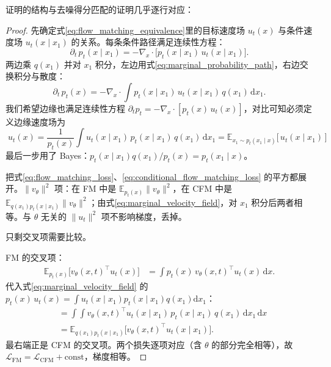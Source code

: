 证明的结构与去噪得分匹配的证明几乎逐行对应：
\begin{proof}
先确定式\eqref{eq:flow_matching_equivalence}里的目标速度场 $u_t(x)$ 与条件速度场 $u_t(x\mid x_1)$ 的关系。每条条件路径满足连续性方程：
\begin{equation}
\partial_t\, p_t(x\mid x_1) = -\nabla_x\cdot\big[p_t(x\mid x_1)\,u_t(x\mid x_1)\big].
\end{equation}
两边乘 $q(x_1)$ 并对 $x_1$ 积分，左边用式\eqref{eq:marginal_probability_path}，右边交换积分与散度：
\begin{equation}
\partial_t\, p_t(x)
= -\nabla_x\cdot\!\int p_t(x\mid x_1)\,u_t(x\mid x_1)\,q(x_1)\,\mathrm{d}x_1.
\end{equation}
我们希望边缘也满足连续性方程 $\partial_t p_t = -\nabla_x\cdot[p_t(x)\,u_t(x)]$，对比可知必须定义边缘速度场为
\begin{equation}\label{eq:marginal_velocity_field}
\boxed{\;
u_t(x) = \frac{1}{p_t(x)}\int u_t(x\mid x_1)\, p_t(x\mid x_1)\, q(x_1)\,\mathrm{d}x_1
= \mathbb{E}_{x_1\sim p_t(x_1\mid x)}\big[\,u_t(x\mid x_1)\,\big]
\;}
\end{equation}
最后一步用了 Bayes：$p_t(x\mid x_1)q(x_1)/p_t(x) = p_t(x_1\mid x)$。

把式\eqref{eq:flow_matching_loss}、\eqref{eq:conditional_flow_matching_loss} 的平方都展开。$\|v_\theta\|^2$ 项：在 FM 中是 $\mathbb{E}_{p_t(x)}\|v_\theta\|^2$，在 CFM 中是 $\mathbb{E}_{q(x_1)p_t(x\mid x_1)}\|v_\theta\|^2$；由式\eqref{eq:marginal_velocity_field}，对 $x_1$ 积分后两者相等。与 $\theta$ 无关的 $\|u_t\|^2$ 项不影响梯度，丢掉。

只剩交叉项需要比较。

FM 的交叉项：
\begin{align}
\mathbb{E}_{p_t(x)}\big[v_\theta(x,t)^\top u_t(x)\big]
&= \int p_t(x)\, v_\theta(x,t)^\top u_t(x)\,\mathrm{d}x.
\end{align}
代入式\eqref{eq:marginal_velocity_field} 的 $p_t(x)\,u_t(x) = \int u_t(x\mid x_1)p_t(x\mid x_1)q(x_1)\mathrm{d}x_1$：
\begin{align}
&= \int\!\!\int v_\theta(x,t)^\top u_t(x\mid x_1)\, p_t(x\mid x_1)\, q(x_1)\,\mathrm{d}x_1\,\mathrm{d}x \nonumber\\
&= \mathbb{E}_{q(x_1)p_t(x\mid x_1)}\big[v_\theta(x,t)^\top u_t(x\mid x_1)\big].
\end{align}
最右端正是 CFM 的交叉项。两个损失逐项对应（含 $\theta$ 的部分完全相等），故 $\mathcal L_{\text{FM}} = \mathcal L_{\text{CFM}} + \text{const}$，梯度相等。
\end{proof}

